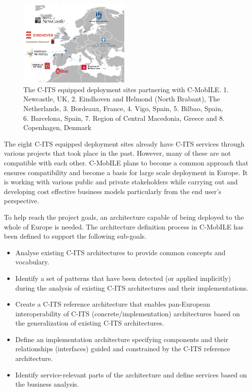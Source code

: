 \documentclass[conference]{IEEEtran}
\begin{document}
\begin{center}
\begin{figure}[ht!]
	\includegraphics[width=0.49\textwidth]{deploymentsites}
	\caption{The C-ITS equipped deployment sites partnering with C-MobILE. 1. Newcastle, UK, 2. Eindhoven and Helmond (North Brabant), The Netherlands, 3. Bordeaux, France, 4. Vigo, Spain, 5. Bilbao, Spain, 6. Barcelona, Spain, 7. Region of Central Macedonia, Greece and 8. Copenhagen, Denmark}
	\label{fig:deployment sites}
\end{figure}	
\end{center}

The eight C-ITS equipped deployment sites already have C-ITS services through various projects that took place in the past.
However, many of these are not compatible with each other.
C-MobILE plans to become a common approach that ensures compatibility and become a basis for large scale deployment in Europe.
It is working with various public and private stakeholders while carrying out and developing cost effective business models particularly from the end user's perspective.

To help reach the project goals, an architecture capable of being deployed to the whole of Europe is needed.
The architecture definition process in C-MobILE has been defined to support the following sub-goals.

\begin{itemize}
  \item Analyse existing C-ITS architectures to provide common concepts and vocabulary.
  \item Identify a set of patterns that have been detected (or applied implicitly) during the analysis of existing C-ITS architectures and their implementations.
  \item Create a C-ITS reference architecture that enables pan-European interoperability of C-ITS (concrete/implementation) architectures based on the generalization of existing C-ITS architectures.
  \item Define an implementation architecture specifying components and their relationships (interfaces) guided and constrained by the C-ITS reference architecture.
  \item Identify service-relevant parts of the architecture and define services based on the business analysis.
\end{itemize}
\end{document}
